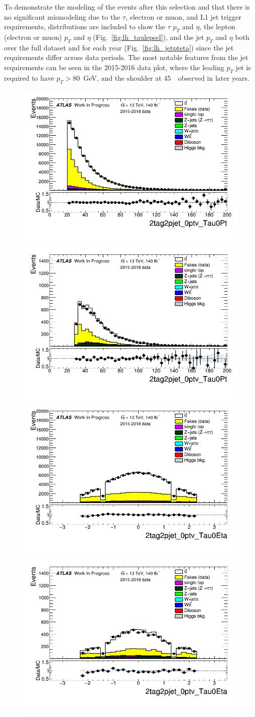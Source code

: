 To demonstrate the modeling of the events after this selection and that there is no significant mismodeling due to the $\tau$, electron or muon, and L1 jet trigger requirements, distributions are included to show the $\tau$ $p_T$ and $\eta$, the lepton (electron or muon) $p_T$ and $\eta$ (Fig.~\ref{fig:lh_taulepsel}), and the jet $p_T$ and $\eta$ both over the full dataset and for each year (Fig.~\ref{fig:lh_jetpteta}) since the jet requirements differ across data periods.  The most notable features from the jet requirements can be seen in the 2015-2016 data plot, where the leading $p_T$ jet is required to have $p_T > 80$~GeV, and the shoulder at 45~\GeV\ observed in later years. 

\begin{figure}
\centering
\includegraphics[width=.45\textwidth]{figures/selection/LepHad_HH/2tag2pjet_0ptv_Tau0Pt_SR_ALLFAKES_SLT_ALL_NR_TRBins.png}
\includegraphics[width=.45\textwidth]{figures/selection/LepHad_HH/2tag2pjet_0ptv_Tau0Pt_SR_ALLFAKES_LTT_ALL_NR_TRBins.png} \\
\includegraphics[width=.45\textwidth]{figures/selection/LepHad_HH/2tag2pjet_0ptv_Tau0Eta_SR_ALLFAKES_SLT_ALL_NR_TRBins.png}
\includegraphics[width=.45\textwidth]{figures/selection/LepHad_HH/2tag2pjet_0ptv_Tau0Eta_SR_ALLFAKES_LTT_ALL_NR_TRBins.png} \\

\end{figure}
